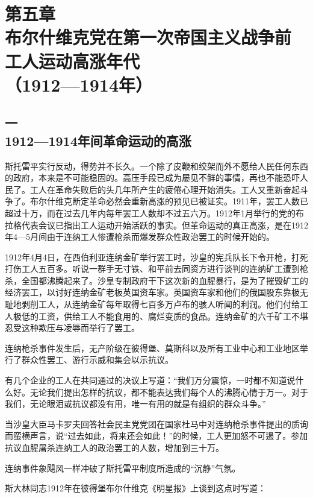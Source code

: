 \section[第五章\q 布尔什维克党在第一次帝国主义战争前工人运动高涨年代（1912—1914年）]{第五章\\ 布尔什维克党在第一次帝国主义战争前\\工人运动高涨年代 \\{（1912—1914年）}}

\subsection[一\q 1912—1914年间革命运动的高涨]{一\\1912—1914年间革命运动的高涨}

斯托雷平实行反动，得势并不长久。一个除了皮鞭和绞架而外不愿给人民任何东西的政府，本来是不可能稳固的。高压手段已成为屡见不鲜的事情，再也不能恐吓人民了。工人在革命失败后的头几年所产生的疲倦心理开始消失。工人又重新奋起斗争了。布尔什维克断定革命必然会重新高涨的预见已被证实。1911年，罢工人数已超过十万，而在过去几年内每年罢工人数却不过五六万。1912年1月举行的党的布拉格代表会议已指出工人运动开始活跃的事实。但革命运动的真正高涨，是在1912年4—5月间由于连纳工人惨遭枪杀而爆发群众性政治罢工的时候开始的。

1912年4月4日，在西伯利亚连纳金矿举行罢工时，沙皇的宪兵队长下令开枪，打死打伤工人五百多。听说一群手无寸铁、和平前去同资方进行谈判的连纳矿工遭到枪杀，全国都沸腾起来了。沙皇专制政府干下这次新的血腥暴行，是为了摧毁矿工的经济罢工，以讨好连纳金矿老板英国资车家。英国资车家和他们的俄国股东靠极无耻地剥削工人，从连纳金矿每年取得七百多万卢布的骇人听闻的利润。他们付给工人极低的工资，供给工人不能食用的、腐烂变质的食品。连纳金矿的六千矿工不堪忍受这种欺压与凌辱而举行了罢工。

连纳枪杀事件发生后，无产阶级在彼得堡、莫斯科以及所有工业中心和工业地区举行了群众性罢工、游行示威和集会以示抗议。

有几个企业的工人在共同通过的决议上写道：“我们万分震惊，一时都不知道说什么好。无论我们提出怎样的抗议，都不能表达我们每个人的沸腾心情于万一。对于我们，无论眼泪或抗议都没有用，唯一有用的就是有组织的群众斗争。”

当沙皇大臣马卡罗夫回答社会民主党党团在国家杜马中对连纳枪杀事件提出的质询而蛮横声言，说“过去如此，将来还会如此！”的时候，工人更加怒不可遏了。参加抗议血腥屠杀连纳工人的政治罢工的人数，增加到三十万。

连纳事件象飓风一样冲破了斯托雷平制度所造成的“沉静”气氛。

斯大林同志1912年在彼得堡布尔什维克《明星报》上谈到这点时写道：

